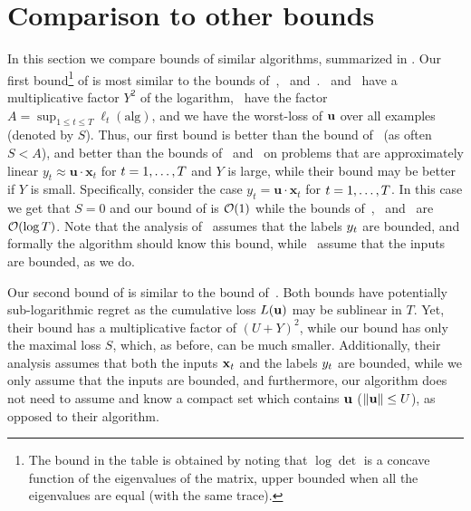 \section{Comparison to other bounds}

In this section we compare bounds of similar algorithms, summarized
in . Our first bound\footnote{The bound in the table is obtained by noting that $\log\det$ is a
concave function of the eigenvalues of the matrix, upper bounded when
all the eigenvalues are equal (with the same trace).} of  is most similar to the bounds
of~\cite{Forster},~\cite{Vovk01} and~\cite{CrammerKuDr12}.~\cite{Forster} and~\cite{Vovk01} have a multiplicative factor $Y^2$ of the logarithm,~\cite{CrammerKuDr12} have the factor $A= \sup_{1\leq t\leq T}\ell_{t}(\textrm{alg})$, and we have the
worst-loss of $\mathbf{u}$ over all examples (denoted by $S$). Thus, our first bound is better than the bound of~\cite{CrammerKuDr12} (as often $S<A$), and better than the bounds of~\cite{Forster} and~\cite{Vovk01}
on problems that are approximately linear $y_{t}
\approx\mathbf{u}\cdot\mathbf{x}_{t}$ for $t = 1 , \ldots , T$ and $Y$
is large, while their bound may be better if $Y$ is small. Specifically, consider the case $y_{t}
=\mathbf{u}\cdot\mathbf{x}_{t}$ for $t = 1 , \ldots , T$. In this case we get that $S=0$ and our bound of  is ${\mathcal{O}}(1)$ while the bounds of~\cite{Forster},~\cite{Vovk01} and~\cite{CrammerKuDr12} are ${\mathcal{O}}(\log{T})$. 
Note that the analysis of~\cite{Forster} assumes that the
labels $y_{t}$ are bounded, and formally the algorithm should know
this bound, while~\cite{CrammerKuDr12} assume that the inputs are
bounded, as we do.

Our second bound of  is similar to the bound of~\cite{OrabonaCBG12}. Both bounds have potentially
sub-logarithmic regret as the cumulative loss $L(\mathbf{u})$ may be
sublinear in $T$. Yet, their bound has a multiplicative factor of
$(U+Y)^2$, while our bound has only the maximal loss $S$,
which, as before, can be much smaller. Additionally, their
analysis assumes that both the inputs $\mathbf{x}_{t}$ and the labels
$y_{t}$ are bounded, while we only assume that the inputs are bounded, and
furthermore, our algorithm does not need to assume and know a compact
set which contains $\mathbf{u}$ ($\left\Vert\mathbf{u}\right\Vert\leq U$), as opposed to their algorithm.

